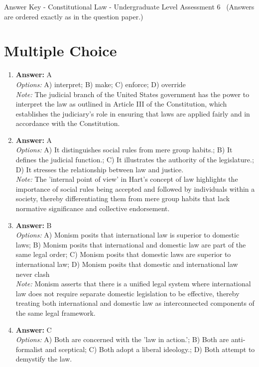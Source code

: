 \documentclass[12pt]{article}
\begin{document}
\begin{center}
Answer Key - Constitutional Law - Undergraduate Level Assessment 6 \
\small (Answers are ordered exactly as in the question paper.)
\end{center}

\section*{Multiple Choice}
\begin{enumerate}[label=\arabic*.]
\item \textbf{Answer:} A
\\ \textit{Options:} A) interpret; B) make; C) enforce; D) override
\\ \textit{Note:} The judicial branch of the United States government has the power to interpret the law as outlined in Article III of the Constitution, which establishes the judiciary's role in ensuring that laws are applied fairly and in accordance with the Constitution.
\item \textbf{Answer:} A
\\ \textit{Options:} A) It distinguishes social rules from mere group habits.; B) It defines the judicial function.; C) It illustrates the authority of the legislature.; D) It stresses the relationship between law and justice.
\\ \textit{Note:} The 'internal point of view' in Hart's concept of law highlights the importance of social rules being accepted and followed by individuals within a society, thereby differentiating them from mere group habits that lack normative significance and collective endorsement.
\item \textbf{Answer:} B
\\ \textit{Options:} A) Monism posits that international law is superior to domestic laws; B) Monism posits that international and domestic law are part of the same legal order; C) Monism posits that domestic laws are superior to international law; D) Monism posits that domestic and international law never clash
\\ \textit{Note:} Monism asserts that there is a unified legal system where international law does not require separate domestic legislation to be effective, thereby treating both international and domestic law as interconnected components of the same legal framework.
\item \textbf{Answer:} C
\\ \textit{Options:} A) Both are concerned with the 'law in action.'; B) Both are anti-formalist and sceptical; C) Both adopt a liberal ideology.; D) Both attempt to demystify the law.

\end{enumerate}
\end{document}
